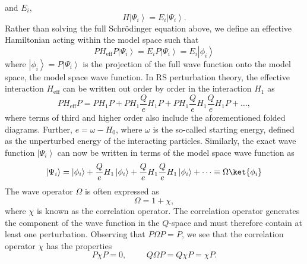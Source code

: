 and $E_{i}$,
\begin{equation}
                H\left|\Psi_{i}\right\rangle= 
                E_{i}\left|\Psi_{i}\right\rangle.
\end{equation}
Rather than solving the full Schr\"{o}dinger equation above, we define
an effective Hamiltonian acting within the model space such
that
\begin{equation}
               PH_{\mathrm{eff}}P\left|\Psi_{i}\right\rangle=
               E_{i}P\left|\Psi_{i}\right\rangle=
              E_{i}\left|\phi_{i}\right\rangle
\end{equation}
where $\left|\phi_{i}\right\rangle=P\left|\Psi_{i}\right\rangle$
is the projection of the full wave function
onto the model space, the model space wave function.
In RS perturbation theory, the effective interaction
$H_{\mathrm{eff}}$ can be written out order by order in the 
interaction $H_1$ as
\begin{equation}
               PH_{\mathrm{eff}}P=PH_1P +PH_1\frac{Q}{e}H_1 P+
               PH_1\frac{Q}{e}H_1 \frac{Q}{e}H_1 P+\dots,
               \label{Morten:eq:effint}
\end{equation}
where terms of third and higher order also
include the aforementioned folded diagrams. 
Further, $e=\omega -H_0$,
where $\omega$ is the so-called starting energy, defined as the unperturbed
energy of the interacting particles. 
Similarly,
the exact wave
function $\left|\Psi_{i}\right\rangle$
can now be written in terms of the model space wave function as
\begin{equation}
                \left|\Psi_{i}\right\rangle=
                \left|\phi_{i}\right\rangle+
                \frac{Q}{e}H_1\left|\phi_{i}\right\rangle
                +\frac{Q}{e}H_1\frac{Q}{e}H_1\left|\phi_{i}\right\rangle
                +\dots \equiv \Omega \ket{\phi_i}
                \label{Morten:eq:wavef}
\end{equation}
The wave operator $\Omega$ is often expressed as 
\begin{equation}
              \Omega = 1 +\chi,
\end{equation}
where $\chi$ is known as the correlation operator. 
The correlation
operator generates the component of the wave function in the $Q$-space
and must therefore contain at least one perturbation. Observing
that $P\Omega P = P$, we see that the correlation operator $\chi$
has the properties
\begin{equation}
               P\chi P = 0, \hspace{1cm} Q\Omega P = 
              Q\chi P =\chi P. \label{Morten:eq:chi1}
\end{equation}
